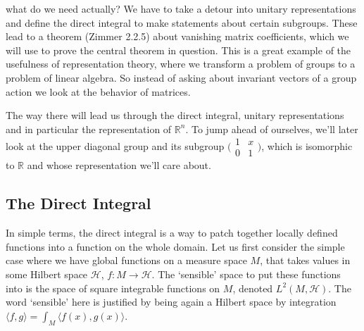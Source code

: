 \documentclass[
  12pt
]{article}
\theoremstyle{break}
\theoremstyle{plain}
\newcommand{\ipmatrix}[1]{%
\ensuremath{\big(\begin{smallmatrix} #1 \end{smallmatrix}\big)}}
\begin{document}
  what do we need actually? We have to take a detour into unitary
  representations and define the direct integral to make statements about
  certain subgroups. These lead to a theorem (Zimmer 2.2.5) about
  vanishing matrix coefficients, which we will use to prove the central
  theorem in question. This is a great example of the usefulness of
  representation theory, where we transform a problem of groups to a
  problem of linear algebra. So instead of asking about invariant vectors
  of a group action we look at the behavior of matrices.

  The way there will lead us through the direct integral, unitary representations
  and in particular the representation of $\mathbb{R}^n$. To jump ahead of
  ourselves, we'll later look at the upper diagonal group and its subgroup
  \ipmatrix{1 & x \\ 0 & 1}, which is isomorphic to $\mathbb{R}$ and whose
  representation we'll care about.

  \hypertarget{the-direct-integral}{%
  \subsection{The Direct Integral}\label{the-direct-integral}}

  In simple terms, the direct integral is a way to patch together locally
  defined functions into a function on the whole domain. Let us first
  consider the simple case where we have global functions on a measure
  space $M$, that takes values in some Hilbert space $\mathscr{H}$,
  $f:M \rightarrow \mathscr{H}$. The `sensible' space to put these
  functions into is the space of square integrable functions on $M$,
  denoted $L^2(M, \mathscr{H})$. The word `sensible' here is justified
  by being again a Hilbert space by integration
  $\langle f, g\rangle = \int_M\langle f(x), g(x)\rangle$.
\end{document}
